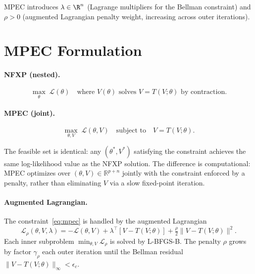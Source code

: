 \documentclass[10pt]{article}
\begin{document}
\commonnotation

\noindent MPEC introduces $\lambda \in \R^n$ (Lagrange multipliers for the Bellman constraint) and $\rho > 0$ (augmented Lagrangian penalty weight, increasing across outer iterations).
\FloatBarrier

\section{MPEC Formulation}

\paragraph{NFXP (nested).}
\begin{equation}
\label{eq:nfxp}
\max_\theta \; \mathcal{L}(\theta) \quad \text{where } V(\theta) \text{ solves } V = T(V;\theta) \text{ by contraction.}
\end{equation}

\paragraph{MPEC (joint).}
\begin{equation}
\label{eq:mpec}
\max_{\theta, V} \; \mathcal{L}(\theta, V) \quad \text{subject to} \quad V = T(V;\theta).
\end{equation}

The feasible set is identical: any $(\theta^*, V^*)$ satisfying the constraint achieves the same log-likelihood value as the NFXP solution.
The difference is computational: MPEC optimizes over $(\theta, V) \in \mathbb{R}^{p+n}$ jointly with the constraint enforced by a penalty, rather than eliminating $V$ via a slow fixed-point iteration.

\paragraph{Augmented Lagrangian.}
The constraint~\eqref{eq:mpec} is handled by the augmented Lagrangian
\begin{equation}
\label{eq:al}
\mathcal{L}_\rho(\theta, V, \lambda)
= -\mathcal{L}(\theta, V)
+ \lambda^\top [V - T(V;\theta)]
+ \tfrac{\rho}{2} \|V - T(V;\theta)\|^2.
\end{equation}
Each inner subproblem $\min_{\theta,V} \mathcal{L}_\rho$ is solved by L-BFGS-B.
The penalty $\rho$ grows by factor $\gamma_\rho$ each outer iteration until the Bellman residual $\|V - T(V;\theta)\|_\infty < \epsilon_c$.
\end{document}
